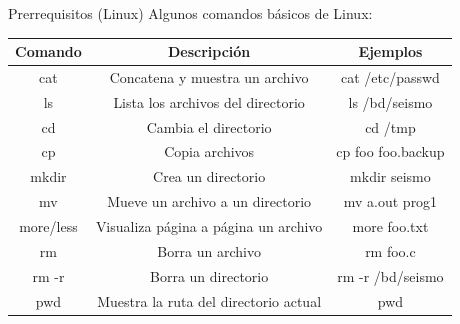 \documentclass[11pt]{beamer}
\begin{document}
\begin{frame}{Prerrequisitos (Linux)}
Algunos comandos básicos de Linux:
\begin{table}
{\small
\begin{tabular}{|c|c|c|}
\hline 
 {\bf Comando} & {\bf Descripción} & {\bf Ejemplos}\\ 
\hline 
cat  & Concatena y muestra un archivo & cat /etc/passwd\\ 
\hline 
ls & Lista los archivos del directorio & ls /bd/seismo \\ 
\hline 
cd & Cambia el directorio & cd /tmp \\ 
\hline 
cp & Copia archivos & cp foo foo.backup \\ 
\hline 
mkdir & Crea un directorio & mkdir seismo \\ 
\hline 
mv & Mueve un archivo a un directorio & mv a.out prog1 \\ 
\hline 
more/less & Visualiza página a página un archivo & more foo.txt \\ 
\hline 
rm  & Borra un archivo & rm foo.c \\ 
\hline 
rm -r  & Borra un directorio & rm -r /bd/seismo\\ 
\hline 
pwd & Muestra la ruta del directorio actual & pwd \\ 
\hline
\end{tabular}}
\end{table} 
\end{frame}
\end{document}
